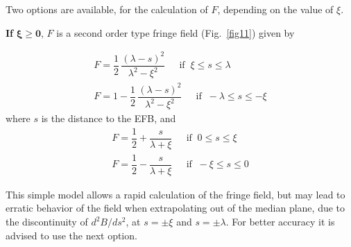 \noindent Two options are available, for the calculation of $ F$, depending
on the value of $\xi$. 

\medskip
\noindent\textbf{If } $\mathbf{\xi  \geq 0}$, $ F $ is a  second
order type fringe field (Fig.~\ref{fig11}) given by 


\begin{gather}
		F  = \dfrac{1 }{ 2} \, \dfrac{(\lambda -s)^2 }{ \lambda^2-\xi^ 2} \quad 
		         ~~ \text{if }~   \xi  \leq  s \leq \lambda  \\
		F  = 1- \dfrac{1 }{ 2} \, \dfrac{(\lambda -s)^2 }{ \lambda^2-\xi^ 2}\quad 
		        ~~ \text{if }~   -\lambda  \leq  s \leq  -\xi 
\end{gather}
where $ s $ is the distance to the EFB, and
\begin{gather}
		 F  = \dfrac{1 }{ 2} + \dfrac{s }{ \lambda +\xi} \quad
		         ~~ \text{if }~  0 \leq  s \leq  \xi  \\
	    F   = \dfrac{1 }{ 2} - \dfrac{s }{ \lambda +\xi}\quad  
		       ~~ \text{if }~   -\xi  \leq  s \leq  0  
\end{gather}
 
\noindent This simple model allows a rapid calculation of the fringe field,
but may lead to erratic behavior of the field when extrapolating out of the median plane, 
due to the discontinuity of $ d^2B/ds^2 $,  at $ s=\pm \xi $ and $ s=\pm \lambda $. 
For better  accuracy it is advised to use the next option. 


